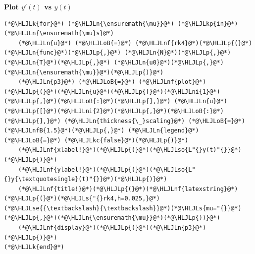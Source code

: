 \documentclass[12pt,a4paper]{article}
\newcommand{\HLJLk}[1]{\textcolor[RGB]{148,91,176}{\textbf{#1}}}
\newcommand{\HLJLkc}[1]{\textcolor[RGB]{59,151,46}{\textit{#1}}}
\newcommand{\HLJLkp}[1]{\textcolor[RGB]{148,91,176}{\textbf{#1}}}
\newcommand{\HLJLn}[1]{#1}
\newcommand{\HLJLnf}[1]{\textcolor[RGB]{66,102,213}{#1}}
\newcommand{\HLJLs}[1]{\textcolor[RGB]{201,61,57}{#1}}
\newcommand{\HLJLse}[1]{\textcolor[RGB]{59,151,46}{#1}}
\newcommand{\HLJLso}[1]{\textcolor[RGB]{201,61,57}{#1}}
\newcommand{\HLJLnfB}[1]{\textcolor[RGB]{59,151,46}{#1}}
\newcommand{\HLJLni}[1]{\textcolor[RGB]{59,151,46}{#1}}
\newcommand{\HLJLoB}[1]{\textcolor[RGB]{102,102,102}{\textbf{#1}}}
\newcommand{\HLJLp}[1]{#1}
\begin{document}
\textbf{Plot $y'(t)$ vs $y(t)$}


\begin{lstlisting}
(*@\HLJLk{for}@*) (*@\HLJLn{\ensuremath{\mu}}@*) (*@\HLJLkp{in}@*) (*@\HLJLn{\ensuremath{\mu}s}@*)
    (*@\HLJLn{u}@*) (*@\HLJLoB{=}@*) (*@\HLJLnf{rk4}@*)(*@\HLJLp{(}@*)(*@\HLJLn{func}@*)(*@\HLJLp{,}@*) (*@\HLJLn{N}@*)(*@\HLJLp{,}@*) (*@\HLJLn{T}@*)(*@\HLJLp{,}@*) (*@\HLJLn{u0}@*)(*@\HLJLp{,}@*) (*@\HLJLn{\ensuremath{\mu}}@*)(*@\HLJLp{)}@*)
    (*@\HLJLn{p3}@*) (*@\HLJLoB{=}@*) (*@\HLJLnf{plot}@*)(*@\HLJLp{(}@*)(*@\HLJLn{u}@*)(*@\HLJLp{[}@*)(*@\HLJLni{1}@*)(*@\HLJLp{,}@*)(*@\HLJLoB{:}@*)(*@\HLJLp{],}@*) (*@\HLJLn{u}@*)(*@\HLJLp{[}@*)(*@\HLJLni{2}@*)(*@\HLJLp{,}@*)(*@\HLJLoB{:}@*)(*@\HLJLp{],}@*) (*@\HLJLn{thickness{\_}scaling}@*) (*@\HLJLoB{=}@*) (*@\HLJLnfB{1.5}@*)(*@\HLJLp{,}@*) (*@\HLJLn{legend}@*) (*@\HLJLoB{=}@*) (*@\HLJLkc{false}@*)(*@\HLJLp{)}@*)
    (*@\HLJLnf{xlabel!}@*)(*@\HLJLp{(}@*)(*@\HLJLso{L"{}y(t)"{}}@*)(*@\HLJLp{)}@*)
    (*@\HLJLnf{ylabel!}@*)(*@\HLJLp{(}@*)(*@\HLJLso{L"{}y{\textquotesingle}(t)"{}}@*)(*@\HLJLp{)}@*)
    (*@\HLJLnf{title!}@*)(*@\HLJLp{(}@*)(*@\HLJLnf{latexstring}@*)(*@\HLJLp{(}@*)(*@\HLJLs{"{}rk4,h=0.025,}@*)(*@\HLJLse{{\textbackslash}{\textbackslash}}@*)(*@\HLJLs{mu="{}}@*)(*@\HLJLp{,}@*)(*@\HLJLn{\ensuremath{\mu}}@*)(*@\HLJLp{))}@*)
    (*@\HLJLnf{display}@*)(*@\HLJLp{(}@*)(*@\HLJLn{p3}@*)(*@\HLJLp{)}@*)
(*@\HLJLk{end}@*)
\end{lstlisting}
\end{document}
